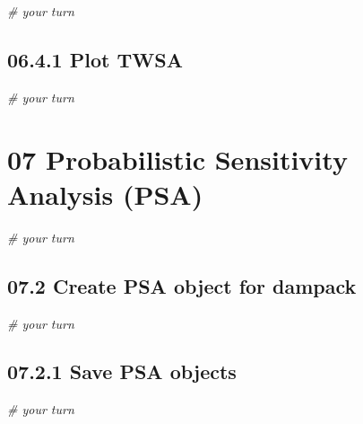 \documentclass[
]{article}
\newenvironment{Shaded}{\begin{snugshade}}{\end{snugshade}}
\newcommand{\CommentTok}[1]{\textcolor[rgb]{0.56,0.35,0.01}{\textit{#1}}}
\begin{document}
\begin{Shaded}
\begin{Highlighting}[]
\CommentTok{# your turn}
\end{Highlighting}
\end{Shaded}

\hypertarget{plot-twsa}{%
\subsection{06.4.1 Plot TWSA}\label{plot-twsa}}

\begin{Shaded}
\begin{Highlighting}[]
\CommentTok{# your turn}
\end{Highlighting}
\end{Shaded}

\hypertarget{probabilistic-sensitivity-analysis-psa}{%
\section{07 Probabilistic Sensitivity Analysis
(PSA)}\label{probabilistic-sensitivity-analysis-psa}}

\begin{Shaded}
\begin{Highlighting}[]
\CommentTok{# your turn}
\end{Highlighting}
\end{Shaded}

\hypertarget{create-psa-object-for-dampack}{%
\subsection{07.2 Create PSA object for
dampack}\label{create-psa-object-for-dampack}}

\begin{Shaded}
\begin{Highlighting}[]
\CommentTok{# your turn}
\end{Highlighting}
\end{Shaded}

\hypertarget{save-psa-objects}{%
\subsection{07.2.1 Save PSA objects}\label{save-psa-objects}}

\begin{Shaded}
\begin{Highlighting}[]
\CommentTok{# your turn}
\end{Highlighting}
\end{Shaded}
\end{document}
